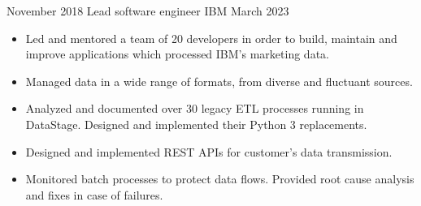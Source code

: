 \begin{experiences}
    \experience
        {November 2018}
        {Lead software engineer}
        {IBM}
        {March 2023}
        {
            \begin{itemize}
                \item Led and mentored a team of 20 developers in order to build, maintain and improve
                    applications which processed IBM's marketing data.
                \item Managed data in a wide range of formats, from diverse and fluctuant sources.
                \item Analyzed and documented over 30 legacy ETL processes running in DataStage. Designed
                      and implemented their Python 3 replacements.
                \item Designed and implemented REST APIs for customer's data transmission.
                \item Monitored batch processes to protect data flows. Provided root cause analysis and
                      fixes in case of failures.

\end{itemize}}
\end{experiences}
